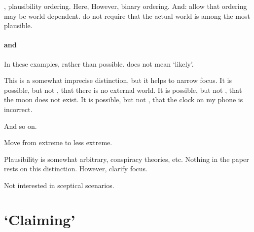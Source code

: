 \begin{note}
  , plausibility ordering.
  Here,
  However, binary ordering.
  And:
  allow that ordering may be world dependent.
  do not require that the actual world is among the most plausible.
\end{note}

\paragraph{ and }

\begin{note}
  In these examples,  rather than possible.
   does not mean `likely'.

  This is a somewhat imprecise distinction, but it helps to narrow focus.
  It is possible, but not , that there is no external world.
  It is possible, but not , that the moon does not exist.
  It is possible, but not , that the clock on my phone is incorrect.

  And so on.

  Move from extreme to less extreme.

  Plausibility is somewhat arbitrary, conspiracy theories, etc.
  Nothing in the paper rests on this distinction.
  However, clarify focus.
\end{note}

\begin{note}
  Not interested in sceptical scenarios.
\end{note}

\section{`Claiming'}
\label{sec:claiming}

